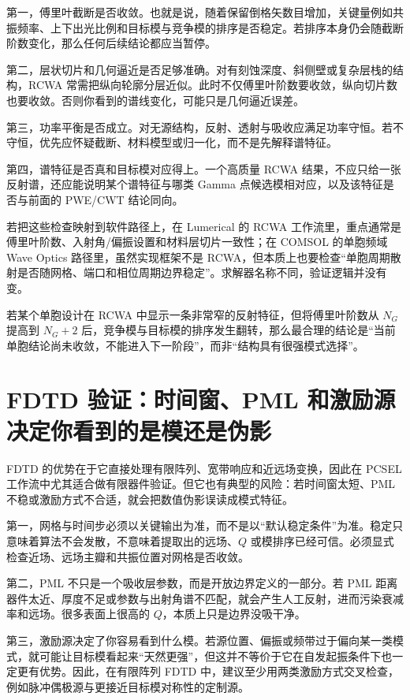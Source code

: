 第一，傅里叶截断是否收敛。也就是说，随着保留倒格矢数目增加，关键量例如共振频率、上下出光比例和目标模与竞争模的排序是否稳定。若排序本身仍会随截断阶数变化，那么任何后续结论都应当暂停。

第二，层状切片和几何逼近是否足够准确。对有刻蚀深度、斜侧壁或复杂层栈的结构，RCWA 常需把纵向轮廓分层近似。此时不仅傅里叶阶数要收敛，纵向切片数也要收敛。否则你看到的谱线变化，可能只是几何逼近误差。

第三，功率平衡是否成立。对无源结构，反射、透射与吸收应满足功率守恒。若不守恒，优先应怀疑截断、材料模型或归一化，而不是先解释谱特征。

第四，谱特征是否真和目标模对应得上。一个高质量 RCWA 结果，不应只给一张反射谱，还应能说明某个谱特征与哪类 Gamma 点候选模相对应，以及该特征是否与前面的 PWE/CWT 结论同向。

若把这些检查映射到软件路径上，在 Lumerical 的 RCWA 工作流里，重点通常是傅里叶阶数、入射角/偏振设置和材料层切片一致性；在 COMSOL 的单胞频域 Wave Optics 路径里，虽然实现框架不是 RCWA，但本质上也要检查“单胞周期散射是否随网格、端口和相位周期边界稳定”。求解器名称不同，验证逻辑并没有变。

若某个单胞设计在 RCWA 中显示一条非常窄的反射特征，但将傅里叶阶数从 $N_G$ 提高到 $N_G+2$ 后，竞争模与目标模的排序发生翻转，那么最合理的结论是“当前单胞结论尚未收敛，不能进入下一阶段”，而非“结构具有很强模式选择”。

\section{FDTD 验证：时间窗、PML 和激励源决定你看到的是模还是伪影}
FDTD 的优势在于它直接处理有限阵列、宽带响应和近远场变换，因此在 PCSEL 工作流中尤其适合做有限器件验证。但它也有典型的风险：若时间窗太短、PML 不稳或激励方式不合适，就会把数值伪影误读成模式特征。

第一，网格与时间步必须以关键输出为准，而不是以“默认稳定条件”为准。稳定只意味着算法不会发散，不意味着提取出的远场、$Q$ 或模排序已经可信。必须显式检查近场、远场主瓣和共振位置对网格是否收敛。

第二，PML 不只是一个吸收层参数，而是开放边界定义的一部分。若 PML 距离器件太近、厚度不足或参数与出射角谱不匹配，就会产生人工反射，进而污染衰减率和远场。很多表面上很高的 $Q$，本质上只是边界没吸干净。

第三，激励源决定了你容易看到什么模。若源位置、偏振或频带过于偏向某一类模式，就可能让目标模看起来“天然更强”，但这并不等价于它在自发起振条件下也一定更有优势。因此，在有限阵列 FDTD 中，建议至少用两类激励方式交叉检查，例如脉冲偶极源与更接近目标模对称性的定制源。

